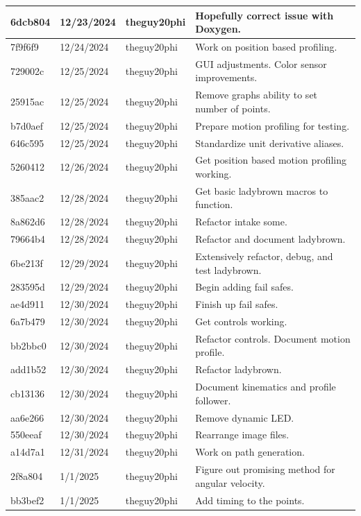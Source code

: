 \begin{center}
\begin{longtable}{|p{28pt}|p{33pt}|p{40pt}|p{300pt}|}
\hline
6dcb804 & 12/23/2024 & theguy20phi & Hopefully correct issue with Doxygen. \\
\hline
7f9f6f9 & 12/24/2024 & theguy20phi & Work on position based profiling. \\
\hline
729002c & 12/25/2024 & theguy20phi & GUI adjustments. Color sensor improvements. \\
\hline
25915ac & 12/25/2024 & theguy20phi & Remove graphs ability to set number of points. \\
\hline
b7d0aef & 12/25/2024 & theguy20phi & Prepare motion profiling for testing. \\
\hline
646c595 & 12/25/2024 & theguy20phi & Standardize unit derivative aliases. \\
\hline
5260412 & 12/26/2024 & theguy20phi & Get position based motion profiling working. \\
\hline
385aac2 & 12/28/2024 & theguy20phi & Get basic ladybrown macros to function. \\
\hline
8a862d6 & 12/28/2024 & theguy20phi & Refactor intake some. \\
\hline
79664b4 & 12/28/2024 & theguy20phi & Refactor and document ladybrown. \\
\hline
6be213f & 12/29/2024 & theguy20phi & Extensively refactor, debug, and test ladybrown. \\
\hline
283595d & 12/29/2024 & theguy20phi & Begin adding fail safes. \\
\hline
ae4d911 & 12/30/2024 & theguy20phi & Finish up fail safes. \\
\hline
6a7b479 & 12/30/2024 & theguy20phi & Get controls working. \\
\hline
bb2bbc0 & 12/30/2024 & theguy20phi & Refactor controls. Document motion profile. \\
\hline
add1b52 & 12/30/2024 & theguy20phi & Refactor ladybrown. \\
\hline
cb13136 & 12/30/2024 & theguy20phi & Document kinematics and profile follower. \\
\hline
aa6e266 & 12/30/2024 & theguy20phi & Remove dynamic LED. \\
\hline
550eeaf & 12/30/2024 & theguy20phi & Rearrange image files. \\
\hline
a14d7a1 & 12/31/2024 & theguy20phi & Work on path generation. \\
\hline
2f8a804 & 1/1/2025 & theguy20phi & Figure out promising method for angular velocity. \\
\hline
bb3bef2 & 1/1/2025 & theguy20phi & Add timing to the points. \\

\end{longtable}
\end{center}
